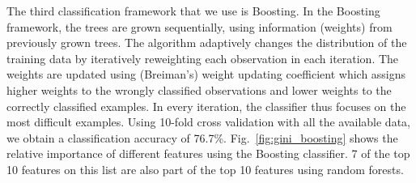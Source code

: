 \documentclass[letterpaper, 10 pt, conference]{ieeeconf}  %
\begin{document}
The third classification framework that we use is Boosting. In the Boosting  framework, the trees are grown sequentially, using information (weights) from previously grown trees.  The algorithm adaptively changes the distribution of the training data by iteratively reweighting each observation in each iteration.  The weights are updated using (Breiman’s) weight updating coefficient which assigns higher weights to the wrongly classified observations and lower weights to the correctly classified examples. In every iteration, the  classifier thus focuses on the most difficult examples. Using 10-fold cross validation with all the available data, we obtain a classification accuracy of 76.7\%. Fig.~\ref{fig:gini_boosting} shows the relative importance of different features using the Boosting classifier. 7 of the top 10 features on this list are also part of the top 10 features using random forests.  
\end{document}
